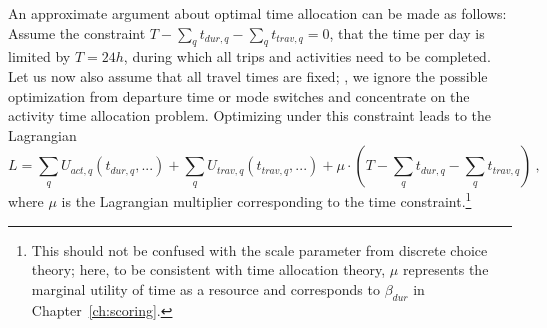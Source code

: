 An approximate argument about optimal time allocation can be made as follows:
Assume the constraint
$T - \sum_q t_{dur,q} - \sum_q t_{trav,q} = 0$, \ie that the time per day is limited by $T = 24h$, during which all trips and activities need to be completed.
%
%
%
Let us now also assume that all travel times are fixed; \ie, we ignore the possible optimization from departure time or mode switches and concentrate on the activity time allocation problem.
%
Optimizing under
this constraint leads to the Lagrangian
\begin{equation}
L = \sum_q U_{act,q}(t_{dur,q}, ...) + \sum_q U_{trav,q}(t_{trav,q}, ...)
%
%
+ \mu \cdot (T - \sum_q t_{dur,q} - \sum_q t_{trav,q})  \ ,
\label{eq:lagrangian}
\end{equation}
where $\mu$ is the Lagrangian multiplier corresponding to the time constraint.\footnote{%
%
This should not be confused with the scale parameter from discrete choice theory; here, to be consistent with time allocation theory, $\mu$ represents the marginal utility of time as a resource and corresponds to $\beta_{dur}$ in Chapter~\ref{ch:scoring}.
%
}

